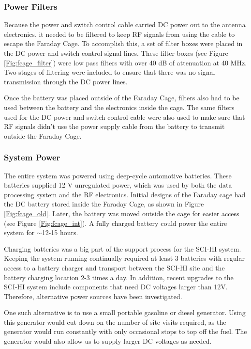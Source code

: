 \subsubsection{Power Filters}
Because the power and switch control cable carried DC power out to the antenna electronics, it needed to be filtered to keep RF signals from using the cable to escape the Faraday Cage. To accomplish this, a set of filter boxes were placed in the DC power and switch control signal lines. These filter boxes (see Figure \ref{Fig:fcage_filter}) were low pass filters with over 40 dB of attenuation at 40 MHz. Two stages of filtering were included to ensure that there was no signal transmission through the DC power lines. 

Once the battery was placed outside of the Faraday Cage, filters also had to be used between the battery and the electronics inside the cage. The same filters used for the DC power and switch control cable were also used to make sure that RF signals didn't use the power supply cable from the battery to transmit outside the Faraday Cage.  

\subsubsection{System Power} \label{Sec:sys_power}
The entire system was powered using deep-cycle automotive batteries. These batteries supplied 12 V unregulated power, which was used by both the data processing system and the RF electronics. Initial designs of the Faraday cage had the DC battery stored inside the Faraday Cage, as shown in Figure \ref{Fig:fcage_old}. Later, the battery was moved outside the cage for easier access (see Figure \ref{Fig:fcage_int}). A fully charged battery could power the entire system for $\sim$12-15 hours. 

Charging batteries was a big part of the support process for the SCI-HI system. Keeping the system running continually required at least 3 batteries with regular access to a battery charger and transport between the SCI-HI site and the battery charging location 2-3 times a day. In addition, recent upgrades to the SCI-HI system include components that need DC voltages larger than 12V. Therefore, alternative power sources have been investigated.

One such alternative is to use a small portable gasoline or diesel generator. Using this generator would cut down on the number of site visits required, as the generator would run constantly with only occasional stops to top off the fuel. The generator would also allow us to supply larger DC voltages as needed. 

